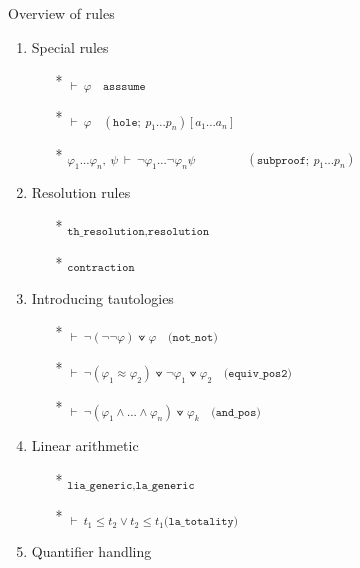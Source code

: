 \documentclass[aspectratio=169,xcolor={dvipsnames}]{beamer}
\begin{document}
\begin{frame}[t]{Overview of rules}
\begin{multicols}{2}
    \begin{enumerate}
        \item Special rules
        \begin{itemize}
            \item[*] \textsubscript{$\vdash~\varphi\quad\texttt{asssume}$}
            \item[*] \textsubscript{$\vdash~\varphi\quad(\texttt{hole};~p_1 \dots p_n)[a_1\dots a_n]$}
            \item[*] \textsubscript{$\varphi_1 \dots \varphi_n,~\psi~\vdash~ \neg \varphi_1 \dots \neg \varphi_n \psi$}
                    \textsubscript{$\qquad\qquad (\texttt{subproof};~p_1 \dots p_n)$}
        \end{itemize}
        \item Resolution rules
        \begin{itemize}
            \item[*] \textsubscript{$\texttt{th\_resolution,resolution}$}
            \item[*] \textsubscript{$\texttt{contraction}$}
        \end{itemize}
        \item Introducing tautologies
        \begin{itemize}
            \item[*] \textsubscript{$\vdash~ \neg (\neg\neg\varphi) \veedot \varphi \quad\texttt{(not\_not)}$}
            \item[*] \textsubscript{$\vdash~ \neg (\varphi_1 \approx \varphi_2) \veedot \neg \varphi_1 \veedot \varphi_2  \quad\texttt{(equiv\_pos2)}$}
            \item[*] \textsubscript{$\vdash~ \neg (\varphi_1 \land \dots \land \varphi_n) \veedot \varphi_k \quad\texttt{(and\_pos)}$}
        \end{itemize}
        \item Linear arithmetic
        \begin{itemize}
            \item[*] \textsubscript{$\texttt{lia\_generic,la\_generic}$}
            \item[*] \textsubscript{$\vdash~ t_1 \leq t_2 \lor t_2 \leq t_1 \texttt{(la\_totality)}$}
        \end{itemize}
        \item Quantifier handling
        \begin{itemize}

\end{itemize}
\end{enumerate}
\end{multicols}
\end{frame}
\end{document}
